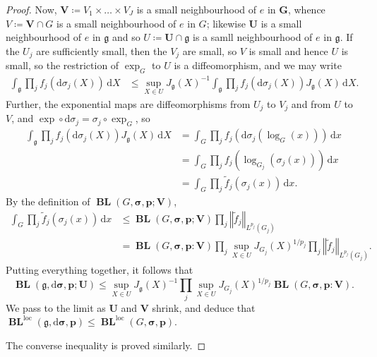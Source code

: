 \documentclass[10pt,a4paper]{amsart}
\newcommand{\BL}{\operatorname{\mathbf{BL}}}
\newcommand{\Lie}[1]{\mathfrak{#1}}
\newcommand{\bsDs}{\boldsymbol{\mathrm{d}\sigma}}
\newcommand{\bsG}{\boldsymbol{G}}
\newcommand{\bsU}{\boldsymbol{U}}
\newcommand{\bsV}{\boldsymbol{V}}
\newcommand{\bsg}{\boldsymbol{\Lie{g}}}
\newcommand{\bsp}{\boldsymbol{p}}
\newcommand{\bss}{\boldsymbol{\sigma}}
\newcommand{\loc}{\mathrm{loc}}
\newcommand{\lpar}{\left( }
\newcommand{\norm}[1]{\left\Vert #1 \right\Vert}
\newcommand{\rpar}{\right) }
\newcommand{\wrt}[1]{\,\mathrm{d} #1}
\begin{document}
\begin{proof}
Now,  $\bsV \coloneqq  V_1 \times \dots \times V_J$ is a small neighbourhood of $e$ in $\bsG$, whence $V \coloneqq  \bsV \cap G$ is a small neighbourhood of $e$ in $G$; likewise $\bsU$ is a small neighbourhood of $e$ in $\bsg$ and so $U \coloneqq  \bsU \cap \Lie{g}$ is a samll neighbourhood of $e$ in $\Lie{g}$.
If the $U_j$ are sufficiently small, then the $V_j$ are small, so $V$ is small and hence $U$ is small, so the restriction of $\exp_G$ to $U$ is a diffeomorphism, and we may write
\begin{align*}
 \int_{\Lie{g}} \prod_j f_j\lpar \mathrm{d}\sigma_j(X)\rpar  \wrt X 
&\leq \sup_{X \in U} J_{\Lie{g}}(X)^{-1}  
	\int_{\Lie{g}} \prod_j f_j\lpar \mathrm{d}\sigma_j(X)\rpar J_{\Lie{g}}(X) \wrt X .
\end{align*}
Further, the exponential maps are diffeomorphisms from $U_j$ to $V_j$ and from $U$ to $V$, and $\exp \circ \mathrm{d}\sigma_j = \sigma_j \circ \exp_G$, so
\begin{align*} 
 \int_{\Lie{g}} \prod_j f_j\lpar \mathrm{d}\sigma_j(X)\rpar J_{\Lie{g}}(X) \wrt X 
&=  \int_{G} \prod_j f_j\lpar \mathrm{d}\sigma_j\lpar \log _{G}(x)\rpar \rpar \wrt x\\
&= \int_{G} \prod_j f_j(\log _{G_{j}}\lpar \sigma_j(x)\rpar )\wrt x\\
&= \int_{G} \prod_j \tilde f_j(\sigma_j(x))\wrt x .
\end{align*}
By the definition of $\BL(G,\bss ,\bsp; \bsV)$,
\begin{align*}
 \int_{G} \prod_j \tilde f_j(\sigma_j(x)) \wrt x 
&\leq\BL(G,\bss ,\bsp; \bsV) \prod_j \norm{  \tilde f_j }_{L^{p_j}(G_j)}  \\
&=\BL(G,\bss ,\bsp: \bsV) \prod_j \sup_{X \in U} J_{G_j}(X)^{1/p_j} \prod_j \norm{  \tilde f_j }_{L^{p_j}(G_j)} .
\end{align*}
Putting everything together, it follows that
\[
\BL(\Lie{g},\bsDs ,\bsp; \bsU) 
\leq \sup_{X \in U} J_{\Lie{g}}(X)^{-1}  \prod_j \sup_{X \in U} J_{G_j}(X)^{1/p_j} \BL(G,\bss ,\bsp: \bsV) .
\]
We pass to the limit as $\bsU$ and $\bsV$ shrink, and deduce that $\BL^{\loc}(\Lie{g},\bsDs ,\bsp) \leq 
\BL^{\loc}(G,\bss ,\bsp)$.

The converse inequality is proved similarly. 
\end{proof}
\end{document}
